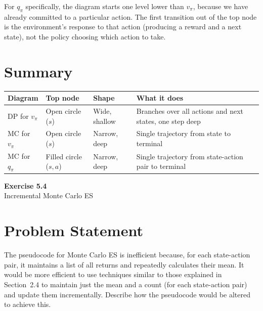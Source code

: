 \documentclass[11pt]{article}
\begin{document}
For $q_\pi$ specifically, the diagram starts one level lower than $v_\pi$, because we have already committed to a particular action. The first transition out of the top node is the environment's response to that action (producing a reward and a next state), not the policy choosing which action to take.

\section*{Summary}

\begin{table}[ht]
    \centering
    \begin{tabular}{p{} p{} p{} p{}}
        \toprule
        \textbf{Diagram} & \textbf{Top node} & \textbf{Shape} & \textbf{What it does} \\
        \midrule
        DP for $v_\pi$ & Open circle ($s$) & Wide, shallow & Branches over all actions and next states, one step deep \\
        \addlinespace
        MC for $v_\pi$ & Open circle ($s$) & Narrow, deep & Single trajectory from state to terminal \\
        \addlinespace
        MC for $q_\pi$ & Filled circle ($s,a$) & Narrow, deep & Single trajectory from state-action pair to terminal \\
        \bottomrule
    \end{tabular}
\end{table}

\newpage

\begin{center}
    {\Large\color{garnet}\textbf{Exercise 5.4}}\\[6pt]
    {\large Incremental Monte Carlo ES}
\end{center}

\section*{Problem Statement}

The pseudocode for Monte Carlo ES is inefficient because, for each state-action pair, it maintains a list of all returns and repeatedly calculates their mean. It would be more efficient to use techniques similar to those explained in Section~2.4 to maintain just the mean and a count (for each state-action pair) and update them incrementally. Describe how the pseudocode would be altered to achieve this.
\end{document}
